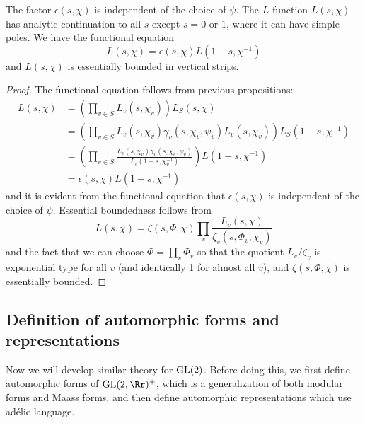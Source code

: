 \begin{theorem}
The factor $\epsilon(s, \chi)$ is independent of the choice of $\psi$. 
The $L$-function $L(s, \chi)$ has analytic continuation to all $s$ except $s = 0$ or $1$, where it can have simple poles. We have the functional equation 
$$
L(s, \chi) = \epsilon(s, \chi) L(1-s, \chi^{-1})
$$
and $L(s, \chi)$ is essentially bounded in vertical strips. 
\end{theorem}
\begin{proof}
The functional equation follows from previous propositions:
\begin{align*}
L(s, \chi) &=\left( \prod_{v\in S}L_{v}(s, \chi_{v})\right) L_{S}(s, \chi) \\
&= \left(\prod_{v\in S} L_{v}(s, \chi_{v}) \gamma_{v}(s, \chi_{v}, \psi_{v}) L_{v}(s, \chi_{v})\right) L_{S}(1-s, \chi^{-1}) \\
&= \left( \prod_{v\in S} \frac{L_{v}(s, \chi_{v}) \gamma_{v}(s, \chi_{v}, \psi_{v})}{L_{v}(1-s, \chi_{v}^{-1})}\right) L(1-s, \chi^{-1}) \\
&= \epsilon(s, \chi) L(1-s, \chi^{-1})
\end{align*}
and it is evident from the functional equation that $\epsilon(s, \chi)$ is independent of the choice of $\psi$. Essential boundedness follows from 
$$
L(s, \chi) = \zeta(s, \Phi, \chi) \prod_{v} \frac{L_{v}(s, \chi)}{\zeta_{v}(s, \Phi_{v}, \chi_{v})}
$$
and the fact that we can choose $\Phi = \prod_{v}\Phi_{v}$ so that the quotient $L_{v} / \zeta_{v}$ is exponential type for all $v$ (and identically 1 for almost all $v$), and $\zeta(s, \Phi, \chi)$ is essentially bounded. 
\end{proof}


















\subsection{Definition of automorphic forms and representations}

Now we will develop similar theory for $\mathrm{GL}(2)$. Before doing this, we first define automorphic forms of $\GL(2, \Rr)^{+}$, which is a generalization of both modular forms and Maass forms, and then define automorphic representations which use ad\'elic language. 


